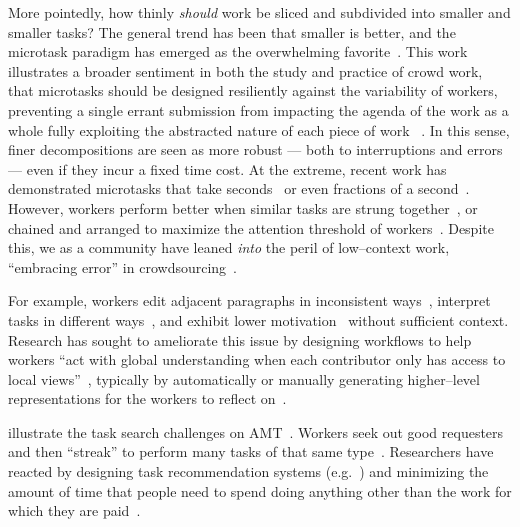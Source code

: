 \documentclass[pn4226]{subfiles}
\begin{document}
More pointedly,
how thinly \textit{should} work be sliced and subdivided into smaller and smaller tasks? 
The general trend has been that smaller is better,
and the microtask paradigm has emerged as the overwhelming favorite~\cite{selfsourcingTeevan2014,selfsourcingTeevan2016}.
This work illustrates a broader sentiment in both the study and practice
of crowd work,
that microtasks should be designed resiliently against the variability of workers,
preventing a single errant submission from impacting the agenda of the work as a whole %
fully exploiting the abstracted nature of each piece of work
~\cite{interruptionIqbal,delayAndOrderLasecki,vaish2014low}.
In this sense,
finer decompositions are seen as more robust
--- both to interruptions and errors~\cite{cheng2015break} ---
even if they incur a fixed time cost.
At the extreme,
recent work has demonstrated
microtasks that take seconds~\cite{Vaish:2014:TCC:2611222.2556996,Cai:2015:WLW:2702123.2702267}
or even fractions of a second~\cite{embracingErrorKrishna}.
However,
workers perform better when similar tasks are strung together~\cite{delayAndOrderLasecki},
or
chained and arranged to maximize the attention threshold of workers~\cite{Cai:2016:CRI:2858036.2858237}.
Despite this,
we as a community have leaned \textit{into} the peril of
low--context work, ``embracing error'' in crowdsourcing~\cite{embracingErrorKrishna}.


For example,
workers edit adjacent paragraphs in inconsistent ways~\cite{bernsteinSoylent,Kim2017},
interpret tasks in different ways~\cite{kairam2016parting},
and exhibit lower motivation~\cite{Kinnaird:2012:WTM:2389176.2389219} without sufficient context.
Research has sought to ameliorate this issue by
designing workflows to help workers ``act with global understanding when
each contributor only has access to local views''~\cite{verroios2014context},
typically by automatically or manually generating higher--level representations
for the workers to reflect on~\cite{chilton2013cascade,verroios2014context,Kim2017}.

\citeauthor{taskSearch} illustrate the task search challenges on AMT~\cite{taskSearch}.
Workers seek out good requesters~\cite{martin2014being} and then 
``streak'' to perform many tasks of that same type~\cite{taskSearch}.
Researchers have reacted by designing task recommendation systems (e.g.~\cite{Cosley:2007:SUI:1216295.1216309})
and minimizing the amount of time that people need to spend doing anything other than
the work for which they are paid~\cite{callison2014crowd}.
\end{document}
